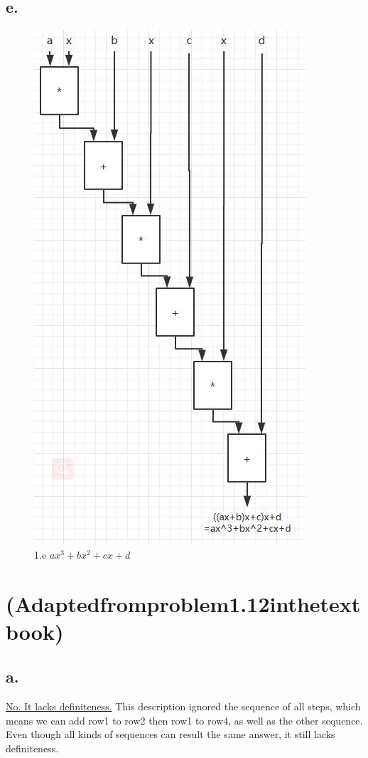 \documentclass[11pt,a4paper]{article}
\begin{document}
	\subsection*{e.}
	\begin{figure}[H]
		\centering
		\includegraphics[scale=0.7]{1_e.jpg}
		\caption{1.e $ax^{3}+bx^{2}+cx+d$}
		\label{1.e}
	\end{figure}\par


	\section{(Adaptedfromproblem1.12inthetextbook)}
	\subsection*{a.}
	\underline{No. It lacks definiteness.} This description ignored the sequence of all steps, which means we can add row1 to row2 then row1 to row4, as well as the other sequence. Even though all kinds of sequences can result the same answer, it still lacks definiteness.
\end{document}
